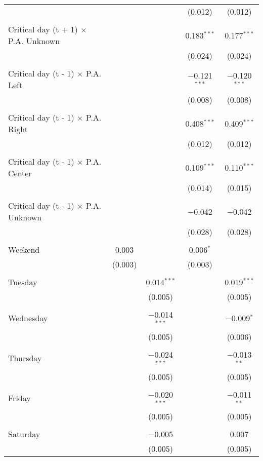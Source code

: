 \documentclass[
]{article}
\begin{document}
\begin{table}[!htbp]
{\begin{tabular}{@{\extracolsep{5pt}}lcccc}
  &  &  & (0.012) & (0.012) \\ 
  & & & & \\ 
 Critical day (t + 1) $\times$ P.A. Unknown &  &  & 0.183$^{***}$ & 0.177$^{***}$ \\ 
  &  &  & (0.024) & (0.024) \\ 
  & & & & \\ 
 Critical day (t - 1) $\times$ P.A. Left &  &  & $-$0.121$^{***}$ & $-$0.120$^{***}$ \\ 
  &  &  & (0.008) & (0.008) \\ 
  & & & & \\ 
 Critical day (t - 1) $\times$ P.A. Right &  &  & 0.408$^{***}$ & 0.409$^{***}$ \\ 
  &  &  & (0.012) & (0.012) \\ 
  & & & & \\ 
 Critical day (t - 1) $\times$ P.A. Center &  &  & 0.109$^{***}$ & 0.110$^{***}$ \\ 
  &  &  & (0.014) & (0.015) \\ 
  & & & & \\ 
 Critical day (t - 1) $\times$ P.A. Unknown &  &  & $-$0.042 & $-$0.042 \\ 
  &  &  & (0.028) & (0.028) \\ 
  & & & & \\ 
 Weekend & 0.003 &  & 0.006$^{*}$ &  \\ 
  & (0.003) &  & (0.003) &  \\ 
  & & & & \\ 
 Tuesday &  & 0.014$^{***}$ &  & 0.019$^{***}$ \\ 
  &  & (0.005) &  & (0.005) \\ 
  & & & & \\ 
 Wednesday &  & $-$0.014$^{***}$ &  & $-$0.009$^{*}$ \\ 
  &  & (0.005) &  & (0.006) \\ 
  & & & & \\ 
 Thursday &  & $-$0.024$^{***}$ &  & $-$0.013$^{**}$ \\ 
  &  & (0.005) &  & (0.005) \\ 
  & & & & \\ 
 Friday &  & $-$0.020$^{***}$ &  & $-$0.011$^{**}$ \\ 
  &  & (0.005) &  & (0.005) \\ 
  & & & & \\ 
 Saturday &  & $-$0.005 &  & 0.007 \\ 
  &  & (0.005) &  & (0.005) \\ 

\end{tabular}}
\end{table}
\end{document}
